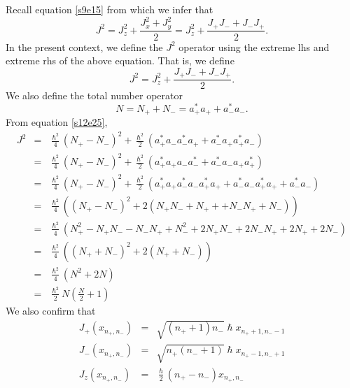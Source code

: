 \documentclass{article}
\numberwithin{equation}{section}
\theoremstyle{plain}
\numberwithin{thm}{section}
\theoremstyle{plain}
\numberwithin{prop}{section}
\theoremstyle{definition}
\numberwithin{defn}{section}
\theoremstyle{remark}
\begin{document}
Recall equation \eqref{s9e15} from which we infer that
\begin{equation}\label{s12e24}
J^2 = J_z^2 + \frac{J_x^2 + J_y^2}{2} = J_z^2 + \frac{J_+J_- + J_-J_+}{2}.
\end{equation}
In the present context, we define the $J^2$ operator using the extreme lhs and
extreme rhs of the above equation. That is, we define
\begin{equation}\label{s12e25}
J^2 = J_z^2 + \frac{J_+J_- + J_-J_+}{2}.
\end{equation}
We also define the total number operator
\begin{equation}\label{s12e26}
N = N_+ + N_- = a_+^\ast a_+ + a_-^\ast a_-.
\end{equation}
From equation \eqref{s12e25},
\begin{eqnarray}
J^2 &=& \frac{\hslash^2}{4}(N_+ - N_-)^2 + \frac{\hslash^2}{2}
\left(a_+^\ast a_-a_-^\ast a_+ + a_-^\ast a_+a_+^\ast a_-\right) \nonumber \\
&=& \frac{\hslash^2}{4}(N_+ - N_-)^2 + \frac{\hslash^2}{2}
\left(a_+^\ast a_+a_-a_-^\ast  + a_-^\ast a_-a_+a_+^\ast \right) \nonumber \\
&=& \frac{\hslash^2}{4}(N_+ - N_-)^2 + \frac{\hslash^2}{2}
\left(a_+^\ast a_+a_-^\ast a_- a_+^\ast a_+ + a_-^\ast a_-a_+^\ast a_+ + a_-^\ast a_-\right)
\nonumber \\
&=& \frac{\hslash^2}{4}\left((N_+ - N_-)^2 + 2(N_+N_- + N_+ + + N_-N_+ + N_-)
\right) \nonumber \\
&=& \frac{\hslash^2}{4}(N_+^2 - N_+N_- - N_-N_+ + N_-^2 + 2N_+N_- +2N_-N_+ + 
2N_+ + 2N_-) \nonumber \\
&=& \frac{\hslash^2}{4}\left((N_+ + N_-)^2 + 2(N_+ + N_-)\right) \nonumber \\
&=& \frac{\hslash^2}{4}(N^2 + 2N) \nonumber \\
&=& \frac{\hslash^2}{2}N\left(\frac{N}{2} + 1\right) \label{s12e27}
\end{eqnarray}
We also confirm that
\begin{eqnarray}
J_+(x_{n_+,n_-}) &=& \sqrt{(n_+ + 1)n_-}\hslash
x_{n_+ + 1, n_- - 1} \label{s12e28} \\
J_-(x_{n_+,n_-}) &=& \sqrt{n_+(n_- + 1)}\hslash
x_{n_+ - 1, n_- + 1} \label{s12e29} \\
J_z(x_{n_+,n_-}) &=& \frac{\hslash}{2}(n_+ - n_-)x_{n_+, n_-} \label{s12e30}
\end{eqnarray}
\end{document}
